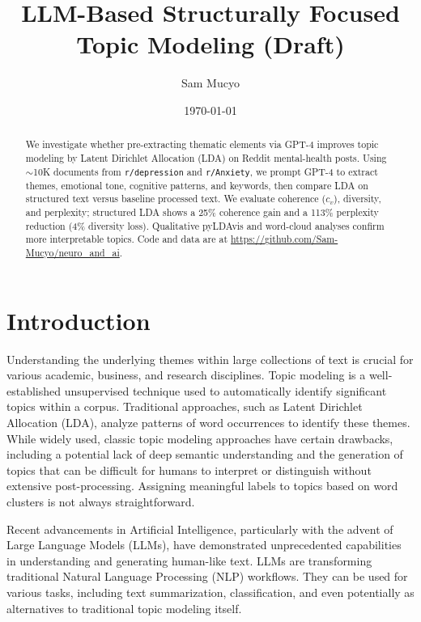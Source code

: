 \documentclass{article}
\title{LLM-Based Structurally Focused Topic Modeling (Draft)}
\author{Sam Mucyo}
\date{\today}
\begin{document}
\maketitle
\doublespacing

\begin{abstract}
    We investigate whether pre-extracting thematic elements via GPT-4 improves topic modeling by Latent Dirichlet Allocation (LDA) on Reddit mental-health posts. Using $\sim$10K documents from \texttt{r/depression} and \texttt{r/Anxiety}, we prompt GPT-4 to extract themes, emotional tone, cognitive patterns, and keywords, then compare LDA on structured text versus baseline processed text. We evaluate coherence ($c_v$), diversity, and perplexity; structured LDA shows a 25\% coherence gain and a 113\% perplexity reduction (4\% diversity loss). Qualitative pyLDAvis and word-cloud analyses confirm more interpretable topics. Code and data are at \url{https://github.com/Sam-Mucyo/neuro_and_ai}.
\end{abstract}

\section{Introduction}

Understanding the underlying themes within large collections of text is crucial for various academic, business, and research disciplines. Topic modeling is a well-established unsupervised technique used to automatically identify significant topics within a corpus. Traditional approaches, such as Latent Dirichlet Allocation (LDA), analyze patterns of word occurrences to identify these themes. While widely used, classic topic modeling approaches have certain drawbacks, including a potential lack of deep semantic understanding and the generation of topics that can be difficult for humans to interpret or distinguish without extensive post-processing. Assigning meaningful labels to topics based on word clusters is not always straightforward.

Recent advancements in Artificial Intelligence, particularly with the advent of Large Language Models (LLMs), have demonstrated unprecedented capabilities in understanding and generating human-like text. LLMs are transforming traditional Natural Language Processing (NLP) workflows. They can be used for various tasks, including text summarization, classification, and even potentially as alternatives to traditional topic modeling itself.
\end{document}
